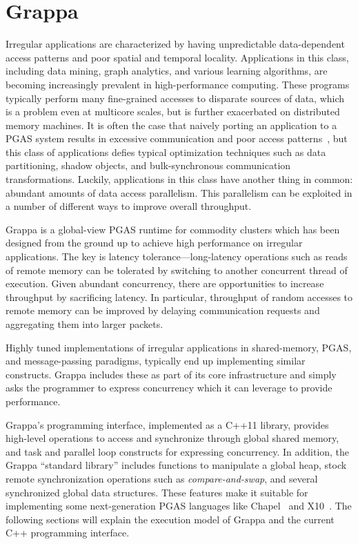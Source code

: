 \section{Grappa}

Irregular applications are characterized by having unpredictable data-dependent access patterns and poor spatial and temporal locality. Applications in this class, including data mining, graph analytics, and various learning algorithms, are becoming increasingly prevalent in high-performance computing. These programs typically perform many fine-grained accesses to disparate sources of data, which is a problem even at multicore scales, but is further exacerbated on distributed memory machines.
It is often the case that naively porting an application to a PGAS system results in excessive communication and poor access patterns~\cite{pgas-analysis}, but this class of applications defies typical optimization techniques such as data partitioning, shadow objects, and bulk-synchronous communication transformations.
Luckily, applications in this class have another thing in common: abundant amounts of data access parallelism. This parallelism can be exploited in a number of different ways to improve overall throughput.


Grappa is a global-view PGAS runtime for commodity clusters which has been designed from the ground up to achieve high performance on irregular applications. The key is latency tolerance---long-latency operations such as reads of remote memory can be tolerated by switching to another concurrent thread of execution. Given abundant concurrency, there are opportunities to increase throughput by sacrificing latency. In particular, throughput of random accesses to remote memory can be improved by delaying communication requests and aggregating them into larger packets.

Highly tuned implementations of irregular applications in shared-memory, PGAS, and message-passing paradigms, typically end up implementing similar constructs. Grappa includes these as part of its core infrastructure and simply asks the programmer to express concurrency which it can leverage to provide performance.

Grappa's programming interface, implemented as a C++11 library, provides high-level operations to access and synchronize through global shared memory, and task and parallel loop constructs for expressing concurrency. In addition, the Grappa ``standard library'' includes functions to manipulate a global heap, stock remote synchronization operations such as \emph{compare-and-swap}, and several synchronized global data structures. These features make it suitable for implementing some next-generation PGAS languages like Chapel~\cite{chapel} and X10~\cite{x10}. The following sections will explain the execution model of Grappa and the current C++ programming interface.

